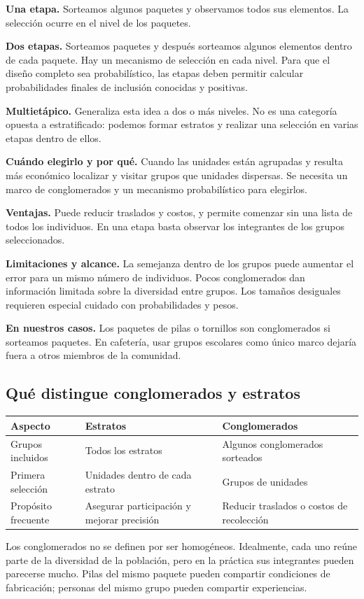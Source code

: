 \documentclass[11pt,letterpaper]{article}
\begin{document}
\textbf{Una etapa.} Sorteamos algunos paquetes y observamos todos sus elementos. La selección ocurre en el nivel de los paquetes.

\textbf{Dos etapas.} Sorteamos paquetes y después sorteamos algunos elementos dentro de cada paquete. Hay un mecanismo de selección en cada nivel. Para que el diseño completo sea probabilístico, las etapas deben permitir calcular probabilidades finales de inclusión conocidas y positivas.

\textbf{Multietápico.} Generaliza esta idea a dos o más niveles. No es una categoría opuesta a estratificado: podemos formar estratos y realizar una selección en varias etapas dentro de ellos.

\textbf{Cuándo elegirlo y por qué.} Cuando las unidades están agrupadas y resulta más económico localizar y visitar grupos que unidades dispersas. Se necesita un marco de conglomerados y un mecanismo probabilístico para elegirlos.

\textbf{Ventajas.} Puede reducir traslados y costos, y permite comenzar sin una lista de todos los individuos. En una etapa basta observar los integrantes de los grupos seleccionados.

\textbf{Limitaciones y alcance.} La semejanza dentro de los grupos puede aumentar el error para un mismo número de individuos. Pocos conglomerados dan información limitada sobre la diversidad entre grupos. Los tamaños desiguales requieren especial cuidado con probabilidades y pesos.

\textbf{En nuestros casos.} Los paquetes de pilas o tornillos son conglomerados si sorteamos paquetes. En cafetería, usar grupos escolares como único marco dejaría fuera a otros miembros de la comunidad.

\subsection{Qué distingue conglomerados y estratos}
\begin{longtable}{p{}p{}p{}}
\toprule\rowcolor{cabecera} Aspecto & Estratos & Conglomerados \\ \midrule
Grupos incluidos & Todos los estratos & Algunos conglomerados sorteados \\
Primera selección & Unidades dentro de cada estrato & Grupos de unidades \\
Propósito frecuente & Asegurar participación y mejorar precisión & Reducir traslados o costos de recolección \\
\bottomrule
\end{longtable}
Los conglomerados no se definen por ser homogéneos. Idealmente, cada uno reúne parte de la diversidad de la población, pero en la práctica sus integrantes pueden parecerse mucho. Pilas del mismo paquete pueden compartir condiciones de fabricación; personas del mismo grupo pueden compartir experiencias.
\end{document}
